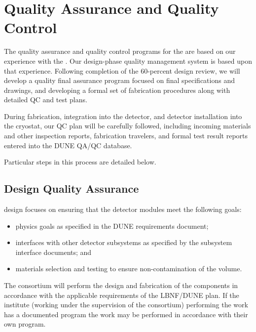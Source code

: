 \section{Quality Assurance and Quality Control}
\label{sec:fdsp-pd-qaqc}

The quality assurance and quality control programs for the  are based on our experience with the .  Our design-phase quality management system is based upon that experience.  Following completion of the 60-percent design review, we will develop a quality final assurance program focused on final specifications and drawings, and developing a formal set of fabrication procedures along with detailed QC and test plans.

During fabrication, integration into the detector, and detector installation into the cryostat, our QC plan will be carefully followed, including incoming materials and other inspection reports, fabrication travelers, and formal test result reports entered into the DUNE QA/QC database.

Particular steps in this process are detailed below.

\subsection{Design Quality Assurance}
\label{sec:fdsp-pd-designqa}

 design  focuses on ensuring that the detector modules meet the following goals:
\begin{itemize}
\item physics goals as specified in the DUNE requirements document;
\item interfaces with other detector subsystems as specified by the subsystem interface documents; and
\item materials selection and testing to ensure non-contamination of the \lar volume.
\end{itemize}

The  consortium will perform the design and fabrication of the components in accordance with the applicable requirements of the LBNF/DUNE  plan. If the institute (working under the supervision of the consortium) performing the work has a documented  program the work may be performed in accordance with their own program.

